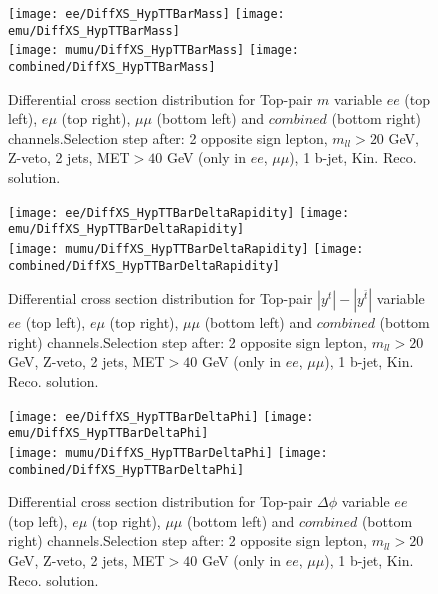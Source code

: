 \documentclass[12pt, a4paper, titlepage]{article}
\begin{document}
\clearpage
\newpage


\begin{figure}
  \texttt{[image: ee/DiffXS\_HypTTBarMass]}
  \texttt{[image: emu/DiffXS\_HypTTBarMass]}\\
  \texttt{[image: mumu/DiffXS\_HypTTBarMass]}
  \texttt{[image: combined/DiffXS\_HypTTBarMass]}
\caption{Differential cross section distribution for  Top-pair $m$ variable  $ee$ (top left), $e\mu$ (top right), $\mu\mu$ (bottom left) and $combined$ (bottom right) channels.\newline Selection step after: 2 opposite sign lepton, $m_{ll}>20$ GeV, Z-veto, 2 jets, MET$>40$ GeV (only in $ee$, $\mu\mu$), 1 b-jet, Kin. Reco. solution.}
\end{figure}

\clearpage
\newpage

\begin{figure}
  \texttt{[image: ee/DiffXS\_HypTTBarDeltaRapidity]}
  \texttt{[image: emu/DiffXS\_HypTTBarDeltaRapidity]}\\
  \texttt{[image: mumu/DiffXS\_HypTTBarDeltaRapidity]}
  \texttt{[image: combined/DiffXS\_HypTTBarDeltaRapidity]}
\caption{Differential cross section distribution for  Top-pair $|y^t| - |y^{\bar{t}}|$ variable  $ee$ (top left), $e\mu$ (top right), $\mu\mu$ (bottom left) and $combined$ (bottom right) channels.\newline Selection step after: 2 opposite sign lepton, $m_{ll}>20$ GeV, Z-veto, 2 jets, MET$>40$ GeV (only in $ee$, $\mu\mu$), 1 b-jet, Kin. Reco. solution.}
\end{figure}

\clearpage
\newpage

\begin{figure}
  \texttt{[image: ee/DiffXS\_HypTTBarDeltaPhi]}
  \texttt{[image: emu/DiffXS\_HypTTBarDeltaPhi]}\\
  \texttt{[image: mumu/DiffXS\_HypTTBarDeltaPhi]}
  \texttt{[image: combined/DiffXS\_HypTTBarDeltaPhi]}
\caption{Differential cross section distribution for  Top-pair $\Delta \phi$ variable  $ee$ (top left), $e\mu$ (top right), $\mu\mu$ (bottom left) and $combined$ (bottom right) channels.\newline Selection step after: 2 opposite sign lepton, $m_{ll}>20$ GeV, Z-veto, 2 jets, MET$>40$ GeV (only in $ee$, $\mu\mu$), 1 b-jet, Kin. Reco. solution.}
\end{figure}

\clearpage
\newpage
\end{document}
